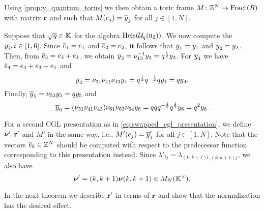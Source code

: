 Using \cref{prop:y_quantum_torus} we then obtain a toric frame $M \colon \mathbb{Z}^N \to
	\operatorname{Fract}(R)$ with matrix $\mathbf{r}$ and such that $M(e_j) = \overline{y}_j$ for all $j \in [1, N]$.

\begin{example}\label{exmp:heisenberg_y_normalization}

	Suppose that $\sqrt{q} \in \mathbb{K}$ for the algebra $\operatorname{Heis}(\mathcal{U}_q(\mathfrak{n}_2))$. We now compute the $\overline{y}_i,
		i\in [1,6]$. Since $\overline{e}_1 = e_1$ and $\overline{e}_2 = e_2$, it follows that $\overline{y}_1 = y_1$ and
	$\overline{y}_2 = y_2$. Then, from $\overline{e}_3 = e_3 + e_1$, we obtain $\overline{y}_3 = \nu_{13}^{-1} y_3 =
		q^{\frac{1}{2}}y_3$. For $\overline{y}_4$ we have $\overline{e}_4 = e_4 + e_3 + e_1$ and
	\begin{equation*}
		\overline{y}_4 = \nu_{31}\nu_{41}\nu_{43}y_4 = q^{\frac{1}{2}}q^{-\frac{1}{2}}q y_4 = qy_4.
	\end{equation*}
	Finally, $\overline{y}_5 = \nu_{52}y_5 = q y_5$ and
	\begin{equation*}
		\overline{y}_6 = (\nu_{31}\nu_{41}\nu_{43})\nu_{61}\nu_{63}\nu_{64} y_6 = q qq^{-\frac{1}{2}}q^{\frac{1}{2}}y_6 = q^2 y_6.
	\end{equation*}
\end{example}

For a second CGL presentation as in \cref{eq:swapped_cgl_presentation}, we define
$\boldsymbol{\nu}', \mathbf{r}'$ and $M'$ in the same way, i.e., $M'(e_j) = \overline{y}'_j$ for all $j \in [1,
		N]$. Note that the vectors $\overline{e}_k \in \mathbb{Z}^N$ should be computed with respect to the
predecessor function corresponding to this presentation instead. Since $\lambda'_{lj} =
	\lambda_{(k, k+1)l, (k, k+1)j}$, we also have
\begin{equation*}
	\boldsymbol{\nu}' = (k, k+1)\boldsymbol{\nu} (k, k+1) \in M_N(\mathbb{K}^\times).
\end{equation*}

In the next theorem we describe $\mathbf{r}'$ in terms of $\mathbf{r}$ and show that the
normalization has the desired effect.

